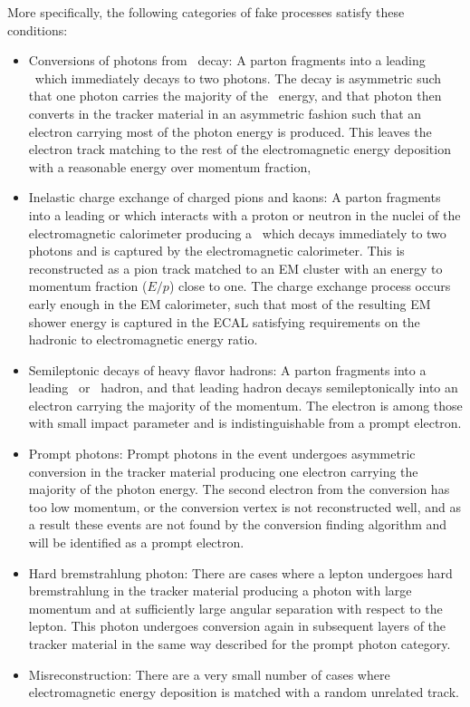 \documentclass{cmspaper}
\begin{document}
More specifically, the following categories of fake processes satisfy these conditions: 
\begin{itemize}
\item Conversions of photons from \pizero\ decay: A parton fragments into a leading \pizero\ which immediately decays to two photons. The decay is asymmetric such that one photon carries the majority of the \pizero\ energy, and that photon then converts in the tracker material in an asymmetric fashion such that an electron carrying most of the photon energy is produced. This leaves the electron track matching to the rest of the electromagnetic energy deposition with a reasonable energy over momentum fraction,
\item Inelastic charge exchange of charged pions and kaons: A parton fragments into a leading \pipm or \Kpm which interacts with a proton or neutron in the nuclei of the electromagnetic calorimeter producing a \pizero\ which decays immediately to two photons and is captured by the electromagnetic calorimeter. This is reconstructed as a pion track matched to an EM cluster with an energy to momentum fraction ($E/p$) close to one. The charge exchange process occurs early enough in the EM calorimeter, such that most of the resulting EM shower energy is captured in the ECAL satisfying requirements on the hadronic to electromagnetic energy ratio. 
\item Semileptonic decays of heavy flavor hadrons: A parton fragments into a leading \B\ or \D\ hadron, and that leading hadron decays semileptonically into an electron carrying the majority of the momentum. The electron is among those with small impact parameter and is indistinguishable from a prompt electron.
\item Prompt photons: Prompt photons in the event undergoes asymmetric conversion in the tracker material producing one electron carrying the majority of the photon energy. The second electron from the conversion has too low momentum, or the conversion vertex is not reconstructed well, and as a result these events are not found by the conversion finding algorithm and will be identified as a prompt electron.
\item Hard bremstrahlung photon: There are cases where a lepton undergoes hard bremstrahlung in the tracker material producing a photon with large momentum and at sufficiently large angular separation with respect to the lepton. This photon undergoes conversion again in subsequent layers of the tracker material in the same way described for the prompt photon category. 
\item Misreconstruction: There are a very small number of cases where electromagnetic energy deposition is matched with a random unrelated track.
\end{itemize}
\end{document}
